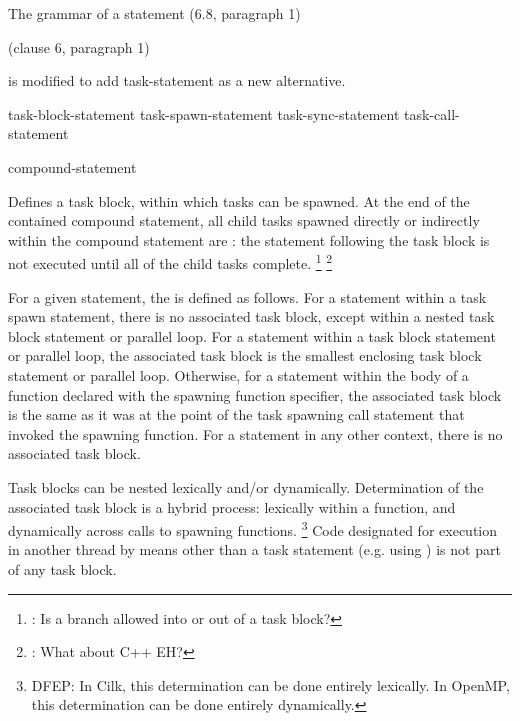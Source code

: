 
\pnum
The grammar of a statement (6.8, paragraph 1)
\begin{cpp}
(clause 6, paragraph 1)
\end{cpp}
is modified to add task-statement as a new alternative.


\begin{bnf}
\br
task-block-statement
\br
task-spawn-statement
\br
task-sync-statement
\br
task-call-statement
\end{bnf}


\begin{bnf}
\br
{}  compound-statement
\end{bnf}


\pnum
Defines a task block, within which tasks can be spawned.
At the end of the contained compound statement,
all child tasks spawned directly or indirectly
within the compound statement are
:
the statement following the task block is not executed
until all of the child tasks complete.
\footnote{:
Is a branch allowed into or out of a task block?
}
\footnote{:
What about C++ EH?
}

\pnum
For a given statement, the
is defined as follows.
For a statement within a task spawn statement,
there is no associated task block,
except within a nested task block statement
or parallel loop.
For a statement within a task block statement
or parallel loop,
the associated task block is the smallest enclosing task block statement
or parallel loop.
Otherwise, for a statement within the body of a function
declared with the spawning function specifier,
the associated task block is the same as it was
at the point of the task spawning call statement
that invoked the spawning function.
For a statement in any other context,
there is no associated task block.

\begin{note}
Task blocks can be nested lexically and/or dynamically.
Determination of the associated task block is a hybrid process:
lexically within a function,
and dynamically across calls to spawning functions.%
\footnote{DFEP:
In Cilk, this determination can be done entirely lexically.
In OpenMP, this determination can be done entirely dynamically.
}
Code designated for execution in another thread
by means other than a task statement
(e.g. using
)
is not part of any task block.
\end{note}

